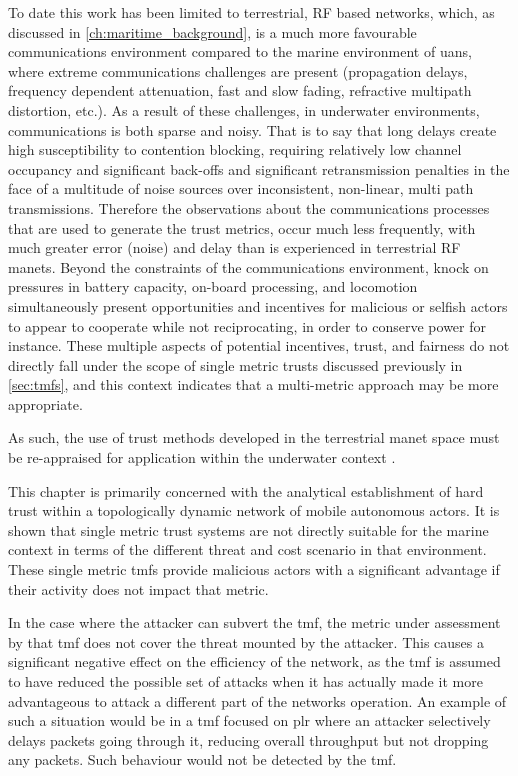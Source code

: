 To date this work has been limited to terrestrial, RF based networks, which, as discussed in \autoref{ch:maritime_background}, is a much more favourable communications environment compared to the marine environment of \glspl{uan}, where extreme communications challenges are present (propagation delays, frequency dependent attenuation, fast and slow fading, refractive multipath distortion, etc.).
As a result of these challenges, in underwater environments, communications is both sparse and noisy.
That is to say that long delays create high susceptibility to contention blocking, requiring relatively low channel occupancy and significant back-offs and significant retransmission penalties in the face of a multitude of noise sources over inconsistent, non-linear, multi path transmissions.
Therefore the observations about the communications processes that are used to generate the trust metrics, occur much less frequently, with much greater error (noise) and delay than is experienced in terrestrial RF \glspl{manet}.
Beyond the constraints of the communications environment, knock on pressures in battery capacity, on-board processing, and locomotion simultaneously present opportunities and incentives for malicious or selfish actors to appear to cooperate while not reciprocating, in order to conserve power for instance.
These multiple aspects of potential incentives, trust, and fairness do not directly fall under the scope of single metric trusts discussed previously in \autoref{sec:tmfs}, and this context indicates that a multi-metric approach may be more appropriate.

As such, the use of trust methods developed in the terrestrial \gls{manet} space must be re-appraised for application within the underwater context \cite{Pavan2015}.

This chapter is primarily concerned with the analytical establishment of hard trust within a topologically dynamic network of mobile autonomous actors.
It is shown that single metric trust systems are not directly suitable for the marine context in terms of the different threat and cost scenario in that environment.
These single metric \glspl{tmf} provide malicious actors with a significant advantage if their activity does not impact that metric.

In the case where the attacker can subvert the \gls{tmf}, the metric under assessment by that \gls{tmf} does not cover the threat mounted by the attacker.
This causes a significant negative effect on the efficiency of the network, as the \gls{tmf} is assumed to have reduced the possible set of attacks when it has actually made it more advantageous to attack a different part of the networks operation.
An example of such a situation would be in a \gls{tmf} focused on \gls{plr} where an attacker selectively delays packets going through it, reducing overall throughput but not dropping any packets.
Such behaviour would not be detected by the \gls{tmf}.

